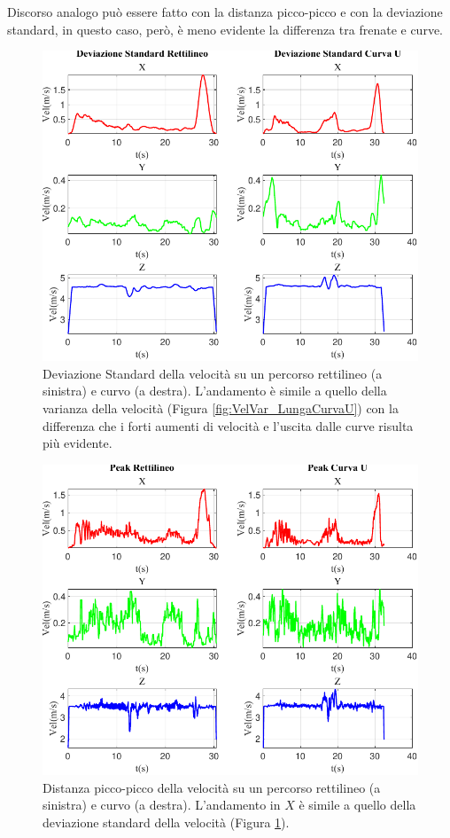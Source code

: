 \documentclass[class=article]{standalone}
\begin{document}
	Discorso analogo può essere fatto con la distanza picco-picco e con la deviazione standard, in questo caso, però, è meno evidente la differenza tra frenate e curve.
	
	\begin{center}
		\begin{figure}[h!]
			\centering\includegraphics[width=.7\textwidth]{img/LungaCurvaU/Vel/Deviazione Standard}
			\caption[]{Deviazione Standard della velocità su un percorso rettilineo (a sinistra) e curvo (a destra). L'andamento è simile a quello della varianza della velocità (Figura \ref{fig:VelVar_LungaCurvaU}) con la differenza che i forti aumenti di velocità e l'uscita dalle curve risulta più evidente.}
			\label{fig:VelStd_LungaCurvaU}
		\end{figure}
	\end{center}
	
	\begin{center}
		\begin{figure}[h!]
			\centering\includegraphics[width=.7\textwidth]{img/LungaCurvaU/Vel/Peak}
			\caption[]{Distanza picco-picco della velocità su un percorso rettilineo (a sinistra) e curvo (a destra). L'andamento in \(X\) è simile a quello della deviazione standard della velocità (Figura \ref{fig:VelStd_LungaCurvaU}).}
			\label{fig:VelPeak_LungaCurvaU}
		\end{figure}
	\end{center}
		
\end{document}
